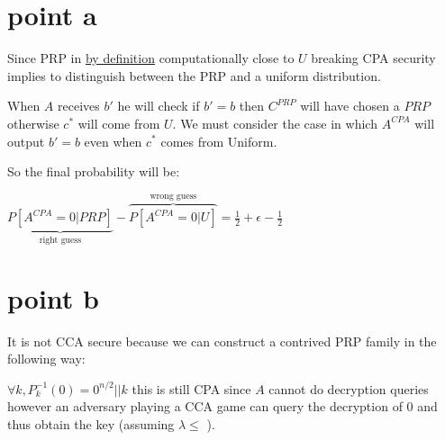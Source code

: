 \section{point a}

Since PRP in \underline{by definition} computationally close to $U$ breaking CPA security implies to distinguish between the PRP and a uniform distribution.

\begin{figure}[h!]
    \centering
    \sdinit{}
\end{figure}

When $A$ receives $b'$ he will check if $b'=b$ then $C^{PRP}$ will have chosen a $PRP$ otherwise $c^*$ will come from $U$. We must consider the case in which $A^{CPA}$ will output $b'=b$ even when $c^*$ comes from Uniform. 

So the final probability will be:

$ \underbrace{P[A^{CPA}=0 | PRP]}_{\text{right guess}} - \overbrace{P[A^{CPA}=0 | U]}^{\text{wrong guess}} = \frac{1}{2}+\epsilon - \frac{1}{2}$

\section{point b}

It is not CCA secure because we can construct a contrived PRP family in the following way:

$\forall k, P_k^{-1}(0) = 0^{n/2} || k$ this is still CPA since $A$ cannot do decryption queries however an adversary  playing a CCA game can query the decryption of $0$ and thus obtain the key (assuming $\lambda \leq $ ).